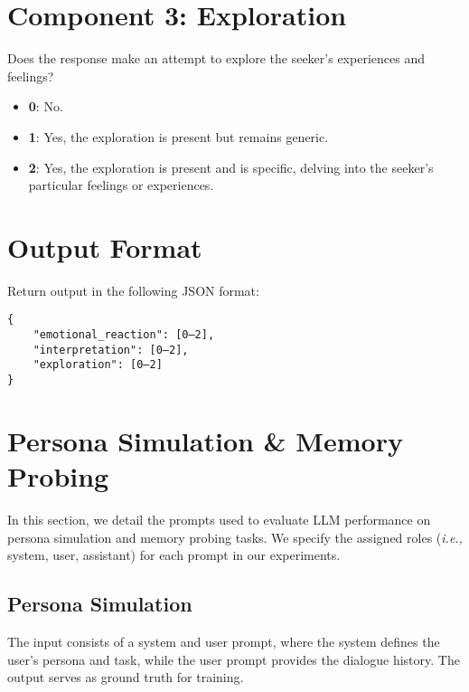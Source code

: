 \begin{tcolorbox}[title=Empathy Assessment, myboxstyle, breakable]
\section*{Component 3: Exploration}
Does the response make an attempt to explore the seeker’s experiences and feelings?
\begin{itemize}
    \item \textbf{0}: No.
    \item \textbf{1}: Yes, the exploration is present but remains generic.
    \item \textbf{2}: Yes, the exploration is present and is specific, delving into the seeker’s particular feelings or experiences.
\end{itemize}

\section*{Output Format}
Return output in the following JSON format:
\begin{verbatim}
{
    "emotional_reaction": [0–2],
    "interpretation": [0–2],
    "exploration": [0–2]
}
\end{verbatim}

\end{tcolorbox}





\section{Persona Simulation \& Memory Probing}  
In this section, we detail the prompts used to evaluate LLM performance on persona simulation and memory probing tasks.  
We specify the assigned roles (\textit{i.e.,} system, user, assistant) for each prompt in our experiments.  

\subsection{Persona Simulation}
\label{ssec:appendix-persona-simulation}
The input consists of a system and user prompt, where the system defines the user’s persona and task, while the user prompt provides the dialogue history.  
The output serves as ground truth for training.

